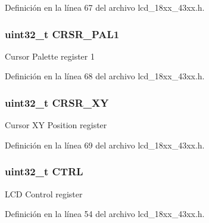 Definición en la línea 67 del archivo lcd\+\_\+18xx\+\_\+43xx.\+h.

\subsubsection[{\texorpdfstring{C\+R\+S\+R\+\_\+\+P\+A\+L1}{CRSR_PAL1}}]{ uint32\+\_\+t C\+R\+S\+R\+\_\+\+P\+A\+L1}\hypertarget{struct_l_p_c___l_c_d___t_aca2b888a5b0941d9ef4f577cf3afe39b}{}\label{struct_l_p_c___l_c_d___t_aca2b888a5b0941d9ef4f577cf3afe39b}
Cursor Palette register 1 

Definición en la línea 68 del archivo lcd\+\_\+18xx\+\_\+43xx.\+h.

\subsubsection[{\texorpdfstring{C\+R\+S\+R\+\_\+\+XY}{CRSR_XY}}]{ uint32\+\_\+t C\+R\+S\+R\+\_\+\+XY}\hypertarget{struct_l_p_c___l_c_d___t_a7d9acf06c82a82ca29a1fe68e13e7023}{}\label{struct_l_p_c___l_c_d___t_a7d9acf06c82a82ca29a1fe68e13e7023}
Cursor XY Position register 

Definición en la línea 69 del archivo lcd\+\_\+18xx\+\_\+43xx.\+h.

\subsubsection[{\texorpdfstring{C\+T\+RL}{CTRL}}]{ uint32\+\_\+t C\+T\+RL}\hypertarget{struct_l_p_c___l_c_d___t_a15fc8d35f045f329b80c544bef35ff64}{}\label{struct_l_p_c___l_c_d___t_a15fc8d35f045f329b80c544bef35ff64}
L\+CD Control register 

Definición en la línea 54 del archivo lcd\+\_\+18xx\+\_\+43xx.\+h.

